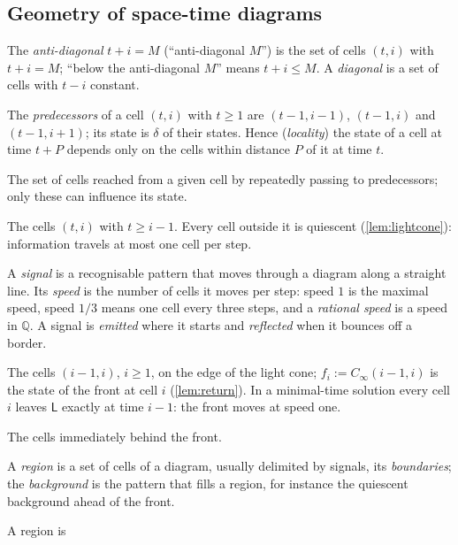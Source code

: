{\subsection{Geometry of space-time diagrams}\label{app:gl-geometry}
\begin{description}[style=unboxed,leftmargin=1em,font=\normalfont\bfseries,itemsep=1pt,parsep=0pt,topsep=2pt]
\item[Anti-diagonal; diagonal.] The \emph{anti-diagonal} $t+i=M$
  (``anti-diagonal $M$'') is the set of cells $(t,i)$ with $t+i=M$;
  ``below the anti-diagonal $M$'' means $t+i\le M$. A \emph{diagonal} is a
  set of cells with $t-i$ constant.
\item[Predecessors; locality.] The \emph{predecessors} of a cell $(t,i)$
  with $t\ge1$ are $(t-1,i-1)$, $(t-1,i)$ and $(t-1,i+1)$; its state is
  $\delta$ of their states. Hence (\emph{locality}) the state of a cell at
  time $t+P$ depends only on the cells within distance $P$ of it at time
  $t$.
\item[Backward dependency cone.] The set of cells reached from a given
  cell by repeatedly passing to predecessors; only these can influence its
  state.
\item[Light cone.] The cells $(t,i)$ with $t\ge i-1$. Every cell outside
  it is quiescent (\cref{lem:lightcone}): information travels at most one
  cell per step.
\item[Signal; speed.] A \emph{signal} is a recognisable pattern that
  moves through a diagram along a straight line. Its \emph{speed} is the
  number of cells it moves per step: speed $1$ is the maximal speed, speed
  $1/3$ means one cell every three steps, and a \emph{rational speed} is a
  speed in $\mathbb Q$. A signal is \emph{emitted} where it starts and
  \emph{reflected} when it bounces off a border.
\item[Front.] The cells $(i-1,i)$, $i\ge1$, on the edge of the light cone;
  $f_i:=C_\infty(i-1,i)$ is the state of the front at cell $i$
  (\cref{lem:return}). In a minimal-time solution every cell $i$ leaves
  $\mathsf L$ exactly at time $i-1$: the front moves at speed one.
\item[Wake.] The cells immediately behind the front.
\item[Region; background; boundary.] A \emph{region} is a set of cells
  of a diagram, usually delimited by signals, its \emph{boundaries}; the
  \emph{background} is the pattern that fills a region, for instance the
  quiescent background ahead of the front.
\item[Doubly periodic; periodic region; checkered region.] A region is

\end{description}}
